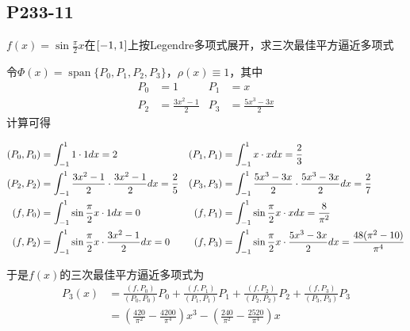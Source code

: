 \subsection{P233-11}
\renewcommand{\FX}{\sin \frac{\pi}{2} x}
\renewcommand{\LRANGE}{-1}
\renewcommand{\RRANGE}{1}
\newcommand{\PA}{P_0}
\newcommand{\PB}{P_1}
\newcommand{\PC}{P_2}
\newcommand{\PD}{P_3}
\renewcommand{\PART}[1]{\frac{(f, P_{#1})}{(P_{#1}, P_{#1})} P_{#1}}
\renewcommand{\COEFFICIENTS}[8]{
\begin{align*}
\FUNCDOT{P_0}{P_0} & = \INTRANGE{\PA \cdot \PA}{x} = #1 &
\FUNCDOT{P_1}{P_1} & = \INTRANGE{\PB \cdot \PB}{x} = #2 \\
\FUNCDOT{P_2}{P_2} & = \INTRANGE{\PC \cdot \PC}{x} = #3 &
\FUNCDOT{P_3}{P_3} & = \INTRANGE{\PD \cdot \PD}{x} = #4 \\
\FUNCDOT{f}{P_0}   & = \INTRANGE{\FX \cdot \PA}{x} = #5 &
\FUNCDOT{f}{P_1}   & = \INTRANGE{\FX \cdot \PB}{x} = #6 \\
\FUNCDOT{f}{P_2}   & = \INTRANGE{\FX \cdot \PC}{x} = #7 &
\FUNCDOT{f}{P_3}   & = \INTRANGE{\FX \cdot \PD}{x} = #8
\end{align*}
}

$f(x) = \FX$在$\RANGE$上按Legendre多项式展开，求三次最佳平方逼近多项式
\begin{SOLVE}
\renewcommand{\PA}{1}
\renewcommand{\PB}{x}
\renewcommand{\PC}{\frac{3 x^2 - 1}{2}}
\renewcommand{\PD}{\frac{5 x^3 - 3 x}{2}}
令$\Phi(x)=\operatorname{span}\{P_0, P_1, P_2, P_3\}$，$\rho(x) \equiv 1$，其中
\begin{align*}
P_0 & = \PA &
P_1 & = \PB \\
P_2 & = \PC &
P_3 & = \PD
\end{align*}
计算可得
\COEFFICIENTS{2}{\frac{2}{3}}{\frac{2}{5}}{\frac{2}{7}}{0}{\frac{8}{\pi^2}}{0}{\frac{48(\pi^2 - 10)}{\pi^4}}
于是$f(x)$的三次最佳平方逼近多项式为\begin{align*}
P_3(x) & = \PART{0} + \PART{1} + \PART{2} + \PART{3} \\
       & = (\frac{420}{\pi^2} - \frac{4200}{\pi^4}) x^3 - (\frac{240}{\pi^2} - \frac{2520}{\pi^4}) x
\end{align*}
\end{SOLVE}